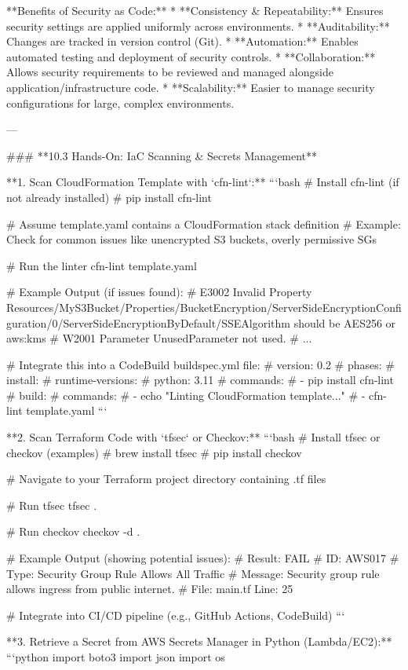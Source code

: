 \documentclass{article}
\begin{document}
**Benefits of Security as Code:**
* **Consistency & Repeatability:** Ensures security settings are applied uniformly across environments.
* **Auditability:** Changes are tracked in version control (Git).
* **Automation:** Enables automated testing and deployment of security controls.
* **Collaboration:** Allows security requirements to be reviewed and managed alongside application/infrastructure code.
* **Scalability:** Easier to manage security configurations for large, complex environments.

---

### **10.3 Hands-On: IaC Scanning & Secrets Management**

**1. Scan CloudFormation Template with `cfn-lint`:**
```bash
# Install cfn-lint (if not already installed)
# pip install cfn-lint

# Assume template.yaml contains a CloudFormation stack definition
# Example: Check for common issues like unencrypted S3 buckets, overly permissive SGs

# Run the linter
cfn-lint template.yaml

# Example Output (if issues found):
# E3002 Invalid Property Resources/MyS3Bucket/Properties/BucketEncryption/ServerSideEncryptionConfiguration/0/ServerSideEncryptionByDefault/SSEAlgorithm should be AES256 or aws:kms
# W2001 Parameter UnusedParameter not used.
# ...

# Integrate this into a CodeBuild buildspec.yml file:
# version: 0.2
# phases:
#   install:
#     runtime-versions:
#       python: 3.11
#     commands:
#       - pip install cfn-lint
#   build:
#     commands:
#       - echo "Linting CloudFormation template..."
#       - cfn-lint template.yaml
```

**2. Scan Terraform Code with `tfsec` or Checkov:**
```bash
# Install tfsec or checkov (examples)
# brew install tfsec
# pip install checkov

# Navigate to your Terraform project directory containing .tf files

# Run tfsec
tfsec .

# Run checkov
checkov -d .

# Example Output (showing potential issues):
# Result: FAIL
# ID: AWS017
# Type: Security Group Rule Allows All Traffic
# Message: Security group rule allows ingress from public internet.
# File: main.tf Line: 25

# Integrate into CI/CD pipeline (e.g., GitHub Actions, CodeBuild)
```

**3. Retrieve a Secret from AWS Secrets Manager in Python (Lambda/EC2):**
```python
import boto3
import json
import os
\end{document}

